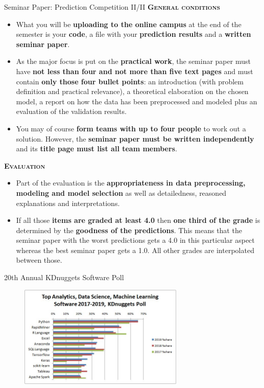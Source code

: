\documentclass[main.tex]{subfiles}
\begin{document}
    \begin{frame}{Seminar Paper: Prediction Competition II/II}
        \alert{\textbf{\textsc{General conditions}}}
        \vspace{-1mm}
        \begin{itemize}
            \item What you will be \textbf{uploading to the online campus} at the end of the semester is your \textbf{code}, a file with your \textbf{prediction results} and a \textbf{written seminar paper}.
            \item As the major focus is put on the \textbf{practical work}, the seminar paper must have \textbf{not less than four and not more than five text pages} and must contain \textbf{only those four bullet points}: an introduction (with problem definition and practical relevance), a theoretical elaboration on the chosen model, a report on how the data has been preprocessed and modeled plus an evaluation of the validation results.
            \item You may of course \textbf{form teams with up to four people} to work out a solution. However, the \textbf{seminar paper must be written independently} and its \textbf{title page must list all team members}.
        \end{itemize}
        \alert{\textbf{\textsc{Evaluation}}}
        \vspace{-1mm}
        \begin{itemize}
            \item Part of the evaluation is the \textbf{appropriateness in data preprocessing, modeling and model selection} as well as detailedness, reasoned explanations and interpretations.
            \item If all those \textbf{items are graded at least 4.0} then \textbf{one third of the grade} is determined by the \textbf{goodness of the predictions}. This means that the seminar paper with the worst predictions gets a 4.0 in this particular aspect whereas the best seminar paper gets a 1.0. All other grades are interpolated between those.
        \end{itemize}
    \end{frame}

    \begin{frame}{20th Annual KDnuggets Software Poll}
        \begin{figure}
            \label{fig:kdnuggets-poll-2019}
            \includegraphics[width=0.7\textwidth]{figures/external/kdnuggets-poll-2019.jpg}
        \end{figure}
    \end{frame}
    
\end{document}
